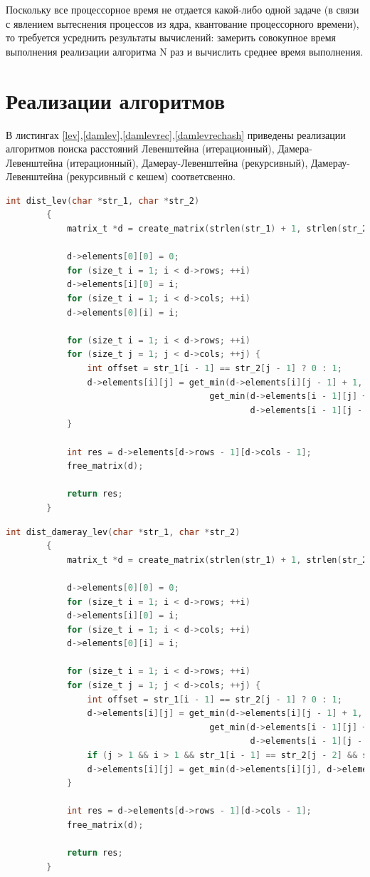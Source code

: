 \documentclass[12pt]{report}
\begin{document}
		Поскольку все процессорное время не отдается какой-либо одной задаче (в связи с явлением вытеснения процессов из ядра, квантование процессорного времени), то требуется усреднить результаты вычислений: замерить совокупное время выполнения реализации алгоритма N раз и вычислить среднее время выполнения.
		
	\section{Реализации алгоритмов}
	
	В листингах \ref{lev},\ref{damlev},\ref{damlevrec},\ref{damlevrechash} приведены реализации алгоритмов поиска расстояний Левенштейна (итерационный), Дамера-Левенштейна (итерационный), Дамерау-Левенштейна (рекурсивный), Дамерау-Левенштейна (рекурсивный с кешем) соответсвенно.
	
	\begin{lstlisting}[label=lev,caption=Листинг итерационного алгоритма поиска расстояния Левенштейна,language=C]
		int dist_lev(char *str_1, char *str_2)
		{
		    matrix_t *d = create_matrix(strlen(str_1) + 1, strlen(str_2) + 1);

		    d->elements[0][0] = 0;
		    for (size_t i = 1; i < d->rows; ++i)
			d->elements[i][0] = i;
		    for (size_t i = 1; i < d->cols; ++i)
			d->elements[0][i] = i;

		    for (size_t i = 1; i < d->rows; ++i)
			for (size_t j = 1; j < d->cols; ++j) {
			    int offset = str_1[i - 1] == str_2[j - 1] ? 0 : 1;
			    d->elements[i][j] = get_min(d->elements[i][j - 1] + 1,
				                        get_min(d->elements[i - 1][j] + 1,
				                                d->elements[i - 1][j - 1] + offset));
			}

		    int res = d->elements[d->rows - 1][d->cols - 1];
		    free_matrix(d);

		    return res;
		}
	\end{lstlisting}

	
	\begin{lstlisting}[label=damlev,caption=Листинг итерационного алгоритма поиска расстояния Дамерау-Левенштейна,language=C]
		int dist_dameray_lev(char *str_1, char *str_2)
		{
		    matrix_t *d = create_matrix(strlen(str_1) + 1, strlen(str_2) + 1);

		    d->elements[0][0] = 0;
		    for (size_t i = 1; i < d->rows; ++i)
			d->elements[i][0] = i;
		    for (size_t i = 1; i < d->cols; ++i)
			d->elements[0][i] = i;

		    for (size_t i = 1; i < d->rows; ++i)
			for (size_t j = 1; j < d->cols; ++j) {
			    int offset = str_1[i - 1] == str_2[j - 1] ? 0 : 1;
			    d->elements[i][j] = get_min(d->elements[i][j - 1] + 1,
				                        get_min(d->elements[i - 1][j] + 1,
				                                d->elements[i - 1][j - 1] + offset));
			    if (j > 1 && i > 1 && str_1[i - 1] == str_2[j - 2] && str_1[i - 2] == str_2[j - 1])
				d->elements[i][j] = get_min(d->elements[i][j], d->elements[i - 2][j - 2] + 1);
			}

		    int res = d->elements[d->rows - 1][d->cols - 1];
		    free_matrix(d);

		    return res;
		}
	\end{lstlisting}
	
\end{document}
